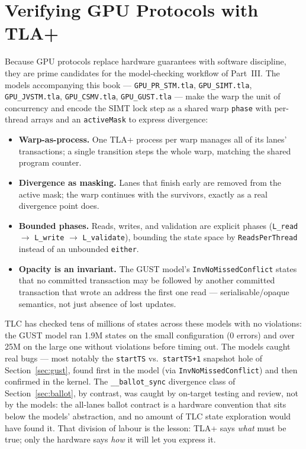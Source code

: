\section{Verifying GPU Protocols with TLA+}
\label{sec:tla}

Because GPU protocols replace hardware guarantees with software discipline,
they are prime candidates for the model-checking workflow of Part~III. The
models accompanying this book --- \texttt{GPU\_PR\_STM.tla},
\texttt{GPU\_SIMT.tla}, \texttt{GPU\_JVSTM.tla}, \texttt{GPU\_CSMV.tla},
\texttt{GPU\_GUST.tla} --- make the warp the unit of concurrency and encode the SIMT lock step as a
shared warp \texttt{phase} with per-thread arrays and an \texttt{activeMask}
to express divergence:

\begin{itemize}
    \item \textbf{Warp-as-process.} One TLA+ process per warp manages all of
          its lanes' transactions; a single transition steps the whole warp,
          matching the shared program counter.
    \item \textbf{Divergence as masking.} Lanes that finish early are removed
          from the active mask; the warp continues with the survivors, exactly
          as a real divergence point does.
    \item \textbf{Bounded phases.} Reads, writes, and validation are explicit
          phases (\texttt{L\_read} $\rightarrow$ \texttt{L\_write}
          $\rightarrow$ \texttt{L\_validate}), bounding the state space by
          \texttt{ReadsPerThread} instead of an unbounded \texttt{either}.
    \item \textbf{Opacity is an invariant.} The GUST model's
          \texttt{InvNoMissedConflict} states that no committed transaction
          may be followed by another committed transaction that wrote an
          address the first one read --- serialisable/opaque semantics, not
          just absence of lost updates.
\end{itemize}

TLC has checked tens of millions of states across these models with no
violations: the GUST model ran 1.9M states on the small configuration (0
errors) and over 25M on the large one without violations before timing out.
The models caught real bugs --- most notably the \texttt{startTS} vs.\
\texttt{startTS+1} snapshot hole of Section~\ref{sec:gust}, found first in
the model (via \texttt{InvNoMissedConflict}) and then confirmed in the
kernel. The \texttt{\_\_ballot\_sync} divergence class of
Section~\ref{sec:ballot}, by contrast, was caught by on-target testing and
review, not by the models: the all-lanes ballot contract is a hardware
convention that sits below the models' abstraction, and no amount of TLC
state exploration would have found it. That division of labour is the
lesson: TLA+ says \emph{what} must be true; only the hardware says
\emph{how} it will let you express it.

